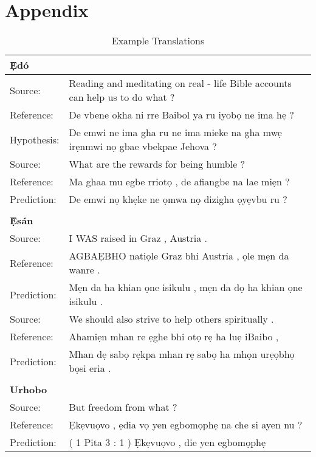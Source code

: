 \documentclass{article} %
\begin{document}



\appendix
\section{Appendix}

\begin{table}[h]
\caption{Example Translations}
\label{translations}
\begin{center}
  \begin{tabular}{ll}
     \textbf{\d{\`E}d{\'o}}  & \\
     \midrule
     \midrule
     Source:   &  Reading and meditating on real - life Bible accounts can help us to do what ?  \\
Reference: & De vbene okha ni rre Baibol ya ru iyob\d{o} ne ima h\d{e} ?  \\
Hypothesis: & De emwi ne ima gha ru ne ima mieke na gha mw\d{e} ir\d{e}nmwi n\d{o} gbae vbekpae Jehova ?  \\
     \midrule
	Source:   &    What are the rewards for being humble ? \\
	Reference:  &  Ma ghaa mu egbe rriot\d{o} , de afiangbe na lae mi\d{e}n ? \\
	Prediction:  & De emwi n\d{o} kh\d{e}ke ne \d{o}mwa n\d{o} dizigha \d{o}y\d{e}vbu ru ? \\
	 \bottomrule
     \\
    \textbf{\d{\`E}s{\'a}n}  & \\
     \midrule
     \midrule
	Source:      &  I WAS raised in Graz , Austria . \\
	Reference:    & AGBA\d{E}BHO nati\d{o}le Graz bhi Austria , \d{o}le m\d{e}n da wanre . \\
	Prediction:   & M\d{e}n da ha khian \d{o}ne isikulu , m\d{e}n da d\d{o} ha khian \d{o}ne isikulu . \\
     \midrule
     Source:    &   We should also strive to help others spiritually . \\
	 Reference:  &  Ahami\d{e}n mhan re \d{e}ghe bhi ot\d{o} r\d{e} ha lu\d{e} iBaibo , \\
	 Prediction:  &  Mhan d\d{e} sab\d{o} r\d{e}kpa mhan r\d{e} sab\d{o} ha mh\d{o}n ur\d{e}\d{o}bh\d{o} b\d{o}si eria . \\
	 \bottomrule
	\\
    \textbf{Urhobo}  & \\
     \midrule
     \midrule
	Source:    &                   But freedom from what ? \\
	Reference: &  		   Ẹk\d{e}vu\d{o}vo , \d{e}dia v\d{o} yen egbomọph\d{e} na che si ayen nu ? \\
	Prediction: & ( 1 Pita 3 : 1 ) Ẹk\d{e}vu\d{o}vo , die yen egbom\d{o}ph\d{e}  \\
     \midrule


\end{tabular}
\end{center}
\end{table}
\end{document}
